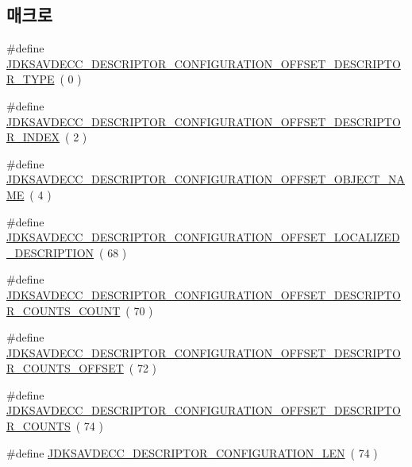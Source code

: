 \subsection*{매크로}
\begin{DoxyCompactItemize}
\item 
\#define \hyperlink{group__descriptor__configuration_gaf6dbd2ae6f58f3c270217901e4810c21}{J\+D\+K\+S\+A\+V\+D\+E\+C\+C\+\_\+\+D\+E\+S\+C\+R\+I\+P\+T\+O\+R\+\_\+\+C\+O\+N\+F\+I\+G\+U\+R\+A\+T\+I\+O\+N\+\_\+\+O\+F\+F\+S\+E\+T\+\_\+\+D\+E\+S\+C\+R\+I\+P\+T\+O\+R\+\_\+\+T\+Y\+PE}~( 0 )
\item 
\#define \hyperlink{group__descriptor__configuration_ga21ae3534adec159d240bd788ff693959}{J\+D\+K\+S\+A\+V\+D\+E\+C\+C\+\_\+\+D\+E\+S\+C\+R\+I\+P\+T\+O\+R\+\_\+\+C\+O\+N\+F\+I\+G\+U\+R\+A\+T\+I\+O\+N\+\_\+\+O\+F\+F\+S\+E\+T\+\_\+\+D\+E\+S\+C\+R\+I\+P\+T\+O\+R\+\_\+\+I\+N\+D\+EX}~( 2 )
\item 
\#define \hyperlink{group__descriptor__configuration_ga17380950248abf4f191aeeb51cc8fee7}{J\+D\+K\+S\+A\+V\+D\+E\+C\+C\+\_\+\+D\+E\+S\+C\+R\+I\+P\+T\+O\+R\+\_\+\+C\+O\+N\+F\+I\+G\+U\+R\+A\+T\+I\+O\+N\+\_\+\+O\+F\+F\+S\+E\+T\+\_\+\+O\+B\+J\+E\+C\+T\+\_\+\+N\+A\+ME}~( 4 )
\item 
\#define \hyperlink{group__descriptor__configuration_ga03b72333665a57dd77b7d2c6f70a0bbf}{J\+D\+K\+S\+A\+V\+D\+E\+C\+C\+\_\+\+D\+E\+S\+C\+R\+I\+P\+T\+O\+R\+\_\+\+C\+O\+N\+F\+I\+G\+U\+R\+A\+T\+I\+O\+N\+\_\+\+O\+F\+F\+S\+E\+T\+\_\+\+L\+O\+C\+A\+L\+I\+Z\+E\+D\+\_\+\+D\+E\+S\+C\+R\+I\+P\+T\+I\+ON}~( 68 )
\item 
\#define \hyperlink{group__descriptor__configuration_ga05c1080ec52ae320bd0da203315685ee}{J\+D\+K\+S\+A\+V\+D\+E\+C\+C\+\_\+\+D\+E\+S\+C\+R\+I\+P\+T\+O\+R\+\_\+\+C\+O\+N\+F\+I\+G\+U\+R\+A\+T\+I\+O\+N\+\_\+\+O\+F\+F\+S\+E\+T\+\_\+\+D\+E\+S\+C\+R\+I\+P\+T\+O\+R\+\_\+\+C\+O\+U\+N\+T\+S\+\_\+\+C\+O\+U\+NT}~( 70 )
\item 
\#define \hyperlink{group__descriptor__configuration_ga2d50a3e2dcf45932f1d0706a0545c354}{J\+D\+K\+S\+A\+V\+D\+E\+C\+C\+\_\+\+D\+E\+S\+C\+R\+I\+P\+T\+O\+R\+\_\+\+C\+O\+N\+F\+I\+G\+U\+R\+A\+T\+I\+O\+N\+\_\+\+O\+F\+F\+S\+E\+T\+\_\+\+D\+E\+S\+C\+R\+I\+P\+T\+O\+R\+\_\+\+C\+O\+U\+N\+T\+S\+\_\+\+O\+F\+F\+S\+ET}~( 72 )
\item 
\#define \hyperlink{group__descriptor__configuration_gacdf8e74a4bad556f945d3b4b839c5b8a}{J\+D\+K\+S\+A\+V\+D\+E\+C\+C\+\_\+\+D\+E\+S\+C\+R\+I\+P\+T\+O\+R\+\_\+\+C\+O\+N\+F\+I\+G\+U\+R\+A\+T\+I\+O\+N\+\_\+\+O\+F\+F\+S\+E\+T\+\_\+\+D\+E\+S\+C\+R\+I\+P\+T\+O\+R\+\_\+\+C\+O\+U\+N\+TS}~( 74 )
\item 
\#define \hyperlink{group__descriptor__configuration_ga78260215d98013c8862d07707d8e1a85}{J\+D\+K\+S\+A\+V\+D\+E\+C\+C\+\_\+\+D\+E\+S\+C\+R\+I\+P\+T\+O\+R\+\_\+\+C\+O\+N\+F\+I\+G\+U\+R\+A\+T\+I\+O\+N\+\_\+\+L\+EN}~( 74 )
\end{DoxyCompactItemize}
